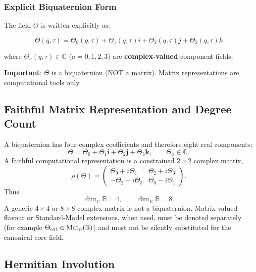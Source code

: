 \subsubsection{Explicit Biquaternion Form}

The field $\Theta$ is written explicitly as:

\begin{equation}
\label{eq:canonical:theta_explicit}
\Theta(q,\tau) = \Theta_0(q,\tau) + \Theta_1(q,\tau) i + \Theta_2(q,\tau) j + \Theta_3(q,\tau) k
\end{equation}

where $\Theta_a(q,\tau) \in \mathbb{C}$ ($a = 0,1,2,3$) are \textbf{complex-valued} component fields.

\textbf{Important}: $\Theta$ is a biquaternion (NOT a matrix). Matrix representations are computational tools only.

\subsection{Faithful Matrix Representation and Degree Count}

A biquaternion has four complex coefficients and therefore eight real
components:
\begin{equation}
  \Theta=\Theta_0+\Theta_1\mathbf i+\Theta_2\mathbf j+\Theta_3\mathbf k,
  \qquad \Theta_a\in\mathbb C.
\end{equation}
A faithful computational representation is a constrained $2\times2$ complex
matrix,
\begin{equation}
\label{eq:canonical:theta_matrix}
  \rho(\Theta)=
  \begin{pmatrix}
    \Theta_0+i\Theta_1 & \Theta_2+i\Theta_3\\
    -\Theta_2+i\Theta_3 & \Theta_0-i\Theta_1
  \end{pmatrix}.
\end{equation}
Thus
\begin{equation}
  \dim_{\mathbb C}\mathbb B=4,
  \qquad
  \dim_{\mathbb R}\mathbb B=8.
\end{equation}
A generic $4\times4$ or $8\times8$ complex matrix is not a biquaternion.
Matrix-valued flavour or Standard-Model extensions, when used, must be denoted
separately (for example $\Theta_{\rm ext}\in\operatorname{Mat}_n(\mathbb B)$)
and must not be silently substituted for the canonical core field.

\subsection{Hermitian Involution}

